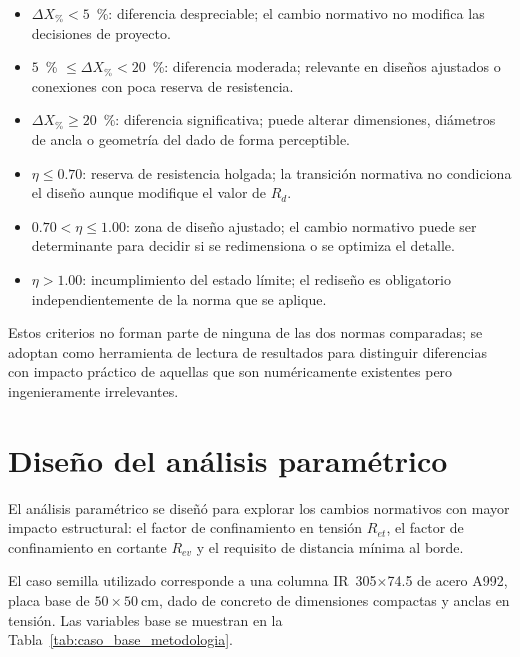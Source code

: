 \begin{itemize}
  \item $\Delta X_{\%} < 5$~\%: diferencia despreciable; el cambio normativo no modifica
    las decisiones de proyecto.
  \item $5$~\% $\leq \Delta X_{\%} < 20$~\%: diferencia moderada; relevante en diseños
    ajustados o conexiones con poca reserva de resistencia.
  \item $\Delta X_{\%} \geq 20$~\%: diferencia significativa; puede alterar dimensiones,
    diámetros de ancla o geometría del dado de forma perceptible.
  \item $\eta \leq 0.70$: reserva de resistencia holgada; la transición normativa no condiciona
    el diseño aunque modifique el valor de $R_d$.
  \item $0.70 < \eta \leq 1.00$: zona de diseño ajustado; el cambio normativo puede ser
    determinante para decidir si se redimensiona o se optimiza el detalle.
  \item $\eta > 1.00$: incumplimiento del estado límite; el rediseño es obligatorio
    independientemente de la norma que se aplique.
\end{itemize}

Estos criterios no forman parte de ninguna de las dos normas comparadas; se adoptan como
herramienta de lectura de resultados para distinguir diferencias con impacto práctico de
aquellas que son numéricamente existentes pero ingenieramente irrelevantes.

\section{Diseño del análisis paramétrico}

El análisis paramétrico se diseñó para explorar los cambios normativos con mayor impacto
estructural: el factor de confinamiento en tensión $R_{et}$, el factor de confinamiento en cortante
$R_{ev}$ y el requisito de distancia mínima al borde.

El caso semilla utilizado corresponde a una columna IR~305$\times$74.5 de acero A992, placa base de
$50\times50~\mathrm{cm}$, dado de concreto de dimensiones compactas y anclas en tensión. Las
variables base se muestran en la Tabla~\ref{tab:caso_base_metodologia}.


